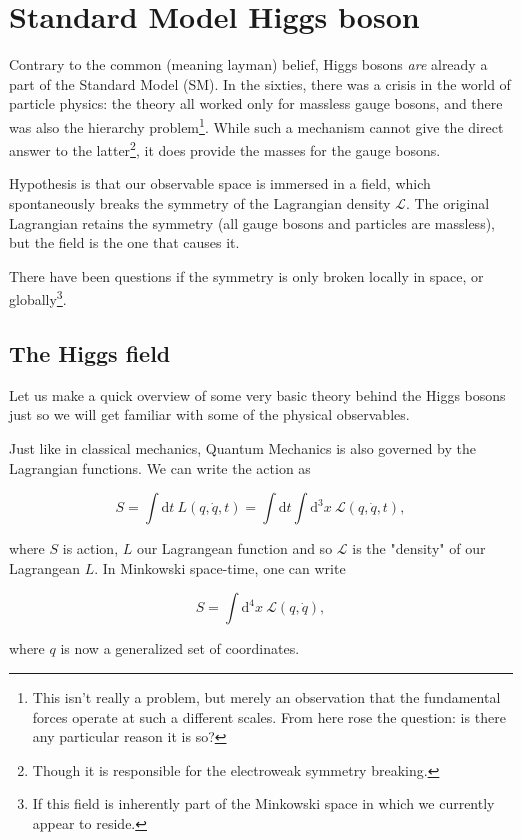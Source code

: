 \section{Standard Model Higgs boson}

Contrary to the common (meaning layman) belief, Higgs bosons \emph{are} already a part of the Standard Model (SM).
In the sixties, there was a crisis in the world of particle physics: the theory all worked only for massless gauge bosons, and there
was also the hierarchy problem\footnote{This isn't really a problem, but merely an observation that the fundamental forces operate
at such a different scales. From here rose the question: is there any particular reason it is so?}. While such a mechanism cannot
give the direct answer to the latter\footnote{Though it is responsible for the electroweak symmetry breaking.}, it does provide the
masses for the gauge bosons.

Hypothesis is that our observable space is immersed in a field, which spontaneously breaks the symmetry of the Lagrangian density
$\mathcal{L}$. The original Lagrangian retains the symmetry (all gauge bosons and particles are massless), but the field is the one
that causes it.

There have been questions if the symmetry is only broken locally in space, or globally\footnote{If this field is inherently part of
the Minkowski space in which we currently appear to reside.}.

\subsection{The Higgs field}

Let us make a quick overview of some very basic theory behind the Higgs bosons just so we will get familiar with some of the
physical observables.

Just like in classical mechanics, Quantum Mechanics is also governed by the Lagrangian functions\cite{peskin}. We can write the
action as

\[
	S = \int \text{d}t\ L(q,\dot{q},t) = \int\text{d}t\int\text{d}^3x\ \mathcal{L}(q,\dot{q},t),
\]

where $S$ is action, $L$ our Lagrangean function and so $\mathcal{L}$ is the "density" of our Lagrangean $L$. In Minkowski space-time,
one can write

\[
	S = \int\text{d}^4x\ \mathcal{L}(q,\dot{q}),
\]

where $q$ is now a generalized set of coordinates.

